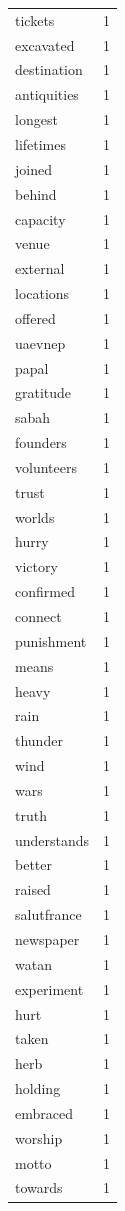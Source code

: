 \begin{tabular}{lr}
tickets & 1 \\
excavated & 1 \\
destination & 1 \\
antiquities & 1 \\
longest & 1 \\
lifetimes & 1 \\
joined & 1 \\
behind & 1 \\
capacity & 1 \\
venue & 1 \\
external & 1 \\
locations & 1 \\
offered & 1 \\
uaevnep & 1 \\
papal & 1 \\
gratitude & 1 \\
sabah & 1 \\
founders & 1 \\
volunteers & 1 \\
trust & 1 \\
worlds & 1 \\
hurry & 1 \\
victory & 1 \\
confirmed & 1 \\
connect & 1 \\
punishment & 1 \\
means & 1 \\
heavy & 1 \\
rain & 1 \\
thunder & 1 \\
wind & 1 \\
wars & 1 \\
truth & 1 \\
understands & 1 \\
better & 1 \\
raised & 1 \\
salutfrance & 1 \\
newspaper & 1 \\
watan & 1 \\
experiment & 1 \\
hurt & 1 \\
taken & 1 \\
herb & 1 \\
holding & 1 \\
embraced & 1 \\
worship & 1 \\
motto & 1 \\
towards & 1 \\

\end{tabular}
